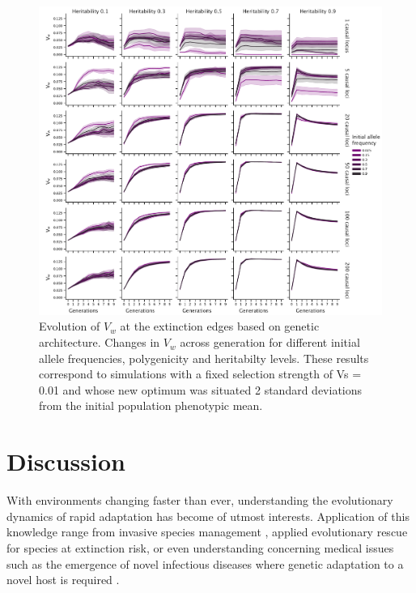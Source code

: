\documentclass{article}
\begin{document}
\begin{figure}[H]
  \centering
  \includegraphics[width=1\textwidth]{figures/var_fitness_across_gen.pdf}
  \caption{Evolution of $V_w$ at the extinction edges based on genetic architecture. Changes in $V_w$ across generation for different initial allele frequencies, polygenicity and heritabilty levels. These results correspond to simulations with a fixed selection strength of Vs = 0.01 and whose new optimum was situated 2 standard deviations from the initial population phenotypic mean.}
  \label{fig:var_fitness_across_gen}
\end{figure}

\section{Discussion}
With environments changing faster than ever, understanding the evolutionary dynamics of rapid adaptation has become of utmost interests. Application of this knowledge range from invasive species management \citep{Lee2002-jg, Lee2008-cd}, applied evolutionary rescue for species at extinction risk, or even understanding concerning medical issues such as the emergence of novel infectious diseases where genetic adaptation to a novel host is required \citep{Holt2002-fn, Antia2003-in}.
\end{document}
